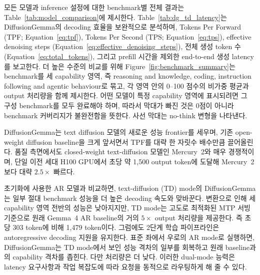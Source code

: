 \documentclass[11pt, a4paper, logo, copyright, gdm]{google}
\begin{document}
모든 모델과 inference 설정에 대한 benchmark별 전체 결과는 Table~\ref{tab:model_comparison}에 제시한다. Table~\ref{tab:dg_td_latency}는 DiffusionGemma의 decoding 효율을 보완적으로 분석하며, Tokens Per Forward (TPF; Equation~\ref{eq:tpf}), Tokens Per Second (TPS; Equation~\ref{eq:tps}), effective denoising steps (Equation~\ref{eq:effective_denoising_steps}), 전체 생성 token 수(Equation~\ref{eq:total_tokens}), 그리고 prefill 시간을 제외한 end-to-end 생성 latency를 보고한다. 더 높은 수준의 비교를 위해 Figure~\ref{fig:benchmark_summary}는 benchmark를 세 capability 영역, 즉 reasoning and knowledge, coding, instruction following and agentic behaviour로 묶고, 각 영역 안의 0--100 점수의 비가중 평균과 output 처리량을 함께 제시한다. 어떤 모델이 특정 capability 영역에 표시되려면 그 구성 benchmark를 모두 완료해야 하며, 따라서 막대가 빠진 것은 0점이 아니라 benchmark 커버리지가 불완전함을 뜻한다. 사선 막대는 no-think 변형을 나타낸다.

DiffusionGemma는 text diffusion 모델의 새로운 성능 frontier를 세우며, 기존 open-weight diffusion baseline을 크게 앞서면서 TPF를 대략 한 자릿수 배수만큼 끌어올린다. 품질 측면에서도 closed-weight text-diffusion 모델인 Mercury~2와 매우 경쟁적이며, 단일 이전 세대 H100 GPU에서 초당 약 1,500 output token에 도달해 Mercury~2보다 대략 $2.5\times$ 빠르다.

초기화에 사용한 AR 모델과 비교하면, text-diffusion (TD) mode의 DiffusionGemma는 일부 절대 benchmark 성능을 더 높은 decoding 속도와 맞바꾼다. 변환으로 인해 세 capability 영역 전반의 성능은 낮아지지만, TD mode는 고도로 최적화된 MTP 서빙 기준으로 원래 Gemma~4 AR baseline의 거의 $5\times$ output 처리량을 제공한다. 즉 초당 303 token에 비해 1,479 token이다. 그럼에도 2단계 학습 파이프라인은 autoregressive decoding 지원을 유지한다. 표준 좌에서 우로의 AR mode로 실행하면, DiffusionGemma는 TD mode에서 보인 성능 격차의 일부를 회복하고 원래 baseline과의 capability 격차를 좁힌다. 다만 처리량은 더 낮다. 이러한 dual-mode 능력은 latency 요구사항과 작업 복잡도에 따라 요청을 동적으로 라우팅하게 해 줄 수 있다.
\end{document}
